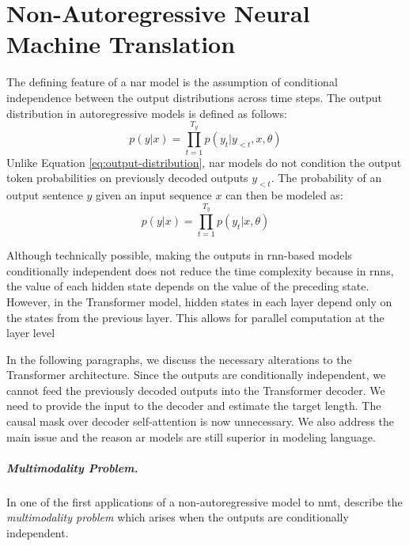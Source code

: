 \chapter{Non-Autoregressive Neural Machine Translation}

The defining feature of a \ac{nar} model is the assumption of
conditional independence between the output distributions across time
steps. The output distribution in autoregressive models is defined as follows:
%
\begin{equation}
  p(y|x) = \prod_{t=1}^{T_y}p(y_t|y_{<t},x,\theta)
  \label{eq:output-distribution}
\end{equation}
%
Unlike Equation \ref{eq:output-distribution}, \Ac{nar} models do not condition
the output token probabilities on previously decoded outputs $y_{<t}$.  The
probability of an output sentence $y$ given an input sequence $x$ can then be
modeled as:
%
\begin{equation}
  p(y|x) = \prod_{t=1}^{T_y}p(y_t|x,\theta)
  \label{eq:nat-output-distribution}
\end{equation}

Although technically possible, making the outputs in \acs{rnn}-based models
conditionally independent does not reduce the time complexity because in
\acsp{rnn}, the value of each hidden state depends on the value of the
preceding state. However, in the Transformer model, hidden states in each layer
depend only on the states from the previous layer. This allows for parallel
computation at the layer level


In the following paragraphs, we discuss the necessary alterations to the
Transformer architecture. Since the outputs are conditionally independent, we
cannot feed the previously decoded outputs into the Transformer decoder. We
need to provide the input to the decoder and estimate the target length. The
causal mask over decoder self-attention is now unnecessary. We also address the
main issue and the reason \ac{ar} models are still superior in modeling
language.

\paragraph{Multimodality Problem.} In one of the first applications of a
non-autoregressive model to \ac{nmt}, \citet{gu2017nonautoregressive} describe
the \emph{multimodality problem} which arises when the outputs are
conditionally independent.

